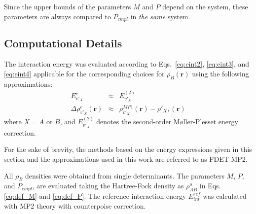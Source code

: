 \documentclass[amsmath,amssymb,preprint,aip,jcp]{revtex4-1}
\begin{document}

Since the upper bounds of the parameters $M$ and $P$ depend on the system, these parameters are always compared to $P_{cmpl}$ 
in {\it the same} system.

\subsection{Computational Details}
The interaction energy was evaluated according to Eqs.~\ref{eq:eint2}, \ref{eq:eint3}, and \ref{eq:eint4} applicable for the corresponding choices for $\rho_B(\mathbf{r})$ using the following approximations:
\begin{eqnarray}
E^{c}_{v'_X}&\approx&E_{v'_X}^{(2)} \label{eq:appr_ec}\\
\Delta \rho^{c}_{v'_X}(\mathbf{r})&\approx&\rho_{v'_X}^{MP1}(\mathbf{r})-\rho'_{X},(\mathbf{r}) \label{eq:appr_rc}
\end{eqnarray}
where $X=A$ or $B$, and $E_{v'_X}^{(2)}$ denotes the second-order M{\o}ller-Plesset energy correction.

For the sake of brevity, the methods based on the energy expressions given in this section and the approximations used in this work are referred to as FDET-MP2. 

All $\rho_B$ densities were obtained from single determinants. The parameters $M$, $P$, and $P_{cmpl}$, are evaluated taking the Hartree-Fock density as $\rho_{AB}^{o}$ in Eqs.  \ref{eq:def_M} and \ref{eq:def_P}.
The reference interaction energy $E_{int}^{ref}$ was calculated with MP2 theory with counterpoise correction.
\end{document}
